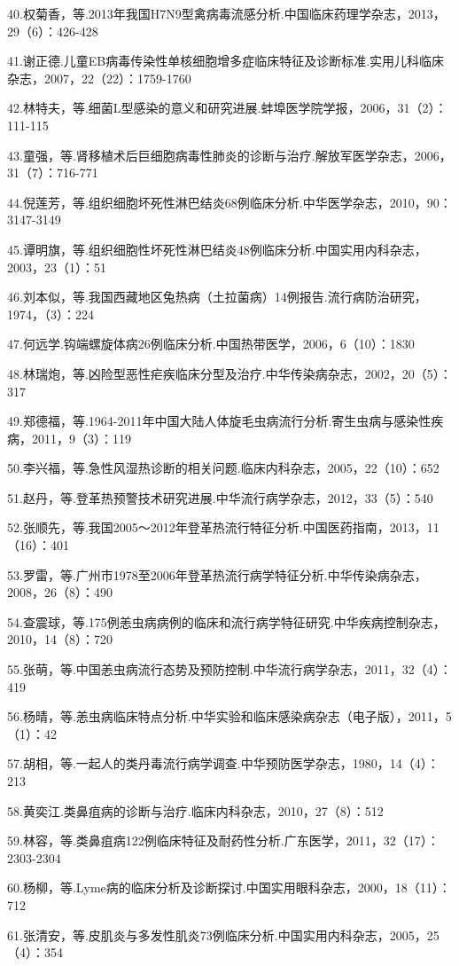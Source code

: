 40.权菊香，等.2013年我国H7N9型禽病毒流感分析.中国临床药理学杂志，2013，29（6）：426-428

41.谢正德.儿童EB病毒传染性单核细胞增多症临床特征及诊断标准.实用儿科临床杂志，2007，22（22）：1759-1760

42.林特夫，等.细菌L型感染的意义和研究进展.蚌埠医学院学报，2006，31（2）：111-115

43.童强，等.肾移植术后巨细胞病毒性肺炎的诊断与治疗.解放军医学杂志，2006，31（7）：716-771

44.倪莲芳，等.组织细胞坏死性淋巴结炎68例临床分析.中华医学杂志，2010，90：3147-3149

45.谭明旗，等.组织细胞性坏死性淋巴结炎48例临床分析.中国实用内科杂志，2003，23（1）：51

46.刘本似，等.我国西藏地区兔热病（土拉菌病）14例报告.流行病防治研究，1974，（3）：224

47.何远学.钩端螺旋体病26例临床分析.中国热带医学，2006，6（10）：1830

48.林瑞炮，等.凶险型恶性疟疾临床分型及治疗.中华传染病杂志，2002，20（5）：317

49.郑德福，等.1964-2011年中国大陆人体旋毛虫病流行分析.寄生虫病与感染性疾病，2011，9（3）：119

50.李兴福，等.急性风湿热诊断的相关问题.临床内科杂志，2005，22（10）：652

51.赵丹，等.登革热预警技术研究进展.中华流行病学杂志，2012，33（5）：540

52.张顺先，等.我国2005～2012年登革热流行特征分析.中国医药指南，2013，11（16）：401

53.罗雷，等.广州市1978至2006年登革热流行病学特征分析.中华传染病杂志，2008，26（8）：490

54.查震球，等.175例恙虫病病例的临床和流行病学特征研究.中华疾病控制杂志，2010，14（8）：720

55.张萌，等.中国恙虫病流行态势及预防控制.中华流行病学杂志，2011，32（4）：419

56.杨晴，等.恙虫病临床特点分析.中华实验和临床感染病杂志（电子版），2011，5（1）：42

57.胡相，等.一起人的类丹毒流行病学调查.中华预防医学杂志，1980，14（4）：213

58.黄奕江.类鼻疽病的诊断与治疗.临床内科杂志，2010，27（8）：512

59.林容，等.类鼻疽病122例临床特征及耐药性分析.广东医学，2011，32（17）：2303-2304

60.杨柳，等.Lyme病的临床分析及诊断探讨.中国实用眼科杂志，2000，18（11）：712

61.张清安，等.皮肌炎与多发性肌炎73例临床分析.中国实用内科杂志，2005，25（4）：354

